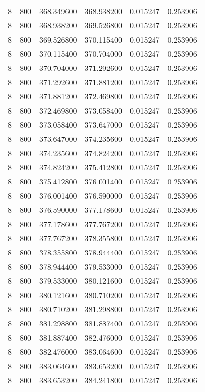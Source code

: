 \begin{longtable}{rrrrrr}
8 & 800 & 368.349600 & 368.938200 & 0.015247 & 0.253906 \\
8 & 800 & 368.938200 & 369.526800 & 0.015247 & 0.253906 \\
8 & 800 & 369.526800 & 370.115400 & 0.015247 & 0.253906 \\
8 & 800 & 370.115400 & 370.704000 & 0.015247 & 0.253906 \\
8 & 800 & 370.704000 & 371.292600 & 0.015247 & 0.253906 \\
8 & 800 & 371.292600 & 371.881200 & 0.015247 & 0.253906 \\
8 & 800 & 371.881200 & 372.469800 & 0.015247 & 0.253906 \\
8 & 800 & 372.469800 & 373.058400 & 0.015247 & 0.253906 \\
8 & 800 & 373.058400 & 373.647000 & 0.015247 & 0.253906 \\
8 & 800 & 373.647000 & 374.235600 & 0.015247 & 0.253906 \\
8 & 800 & 374.235600 & 374.824200 & 0.015247 & 0.253906 \\
8 & 800 & 374.824200 & 375.412800 & 0.015247 & 0.253906 \\
8 & 800 & 375.412800 & 376.001400 & 0.015247 & 0.253906 \\
8 & 800 & 376.001400 & 376.590000 & 0.015247 & 0.253906 \\
8 & 800 & 376.590000 & 377.178600 & 0.015247 & 0.253906 \\
8 & 800 & 377.178600 & 377.767200 & 0.015247 & 0.253906 \\
8 & 800 & 377.767200 & 378.355800 & 0.015247 & 0.253906 \\
8 & 800 & 378.355800 & 378.944400 & 0.015247 & 0.253906 \\
8 & 800 & 378.944400 & 379.533000 & 0.015247 & 0.253906 \\
8 & 800 & 379.533000 & 380.121600 & 0.015247 & 0.253906 \\
8 & 800 & 380.121600 & 380.710200 & 0.015247 & 0.253906 \\
8 & 800 & 380.710200 & 381.298800 & 0.015247 & 0.253906 \\
8 & 800 & 381.298800 & 381.887400 & 0.015247 & 0.253906 \\
8 & 800 & 381.887400 & 382.476000 & 0.015247 & 0.253906 \\
8 & 800 & 382.476000 & 383.064600 & 0.015247 & 0.253906 \\
8 & 800 & 383.064600 & 383.653200 & 0.015247 & 0.253906 \\
8 & 800 & 383.653200 & 384.241800 & 0.015247 & 0.253906 \\

\end{longtable}
